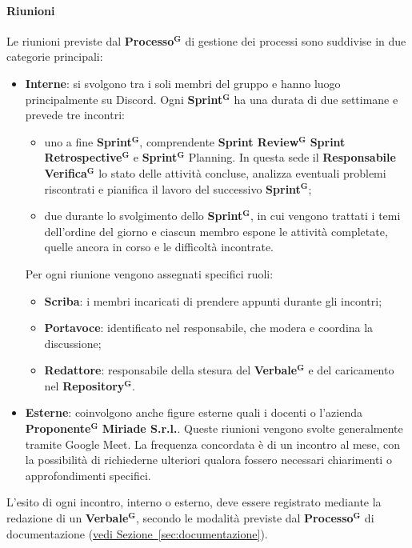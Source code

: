 \documentclass[a4paper,12pt]{article}
\newcommand{\term}[1]{\textbf{#1}$^\mathbf{G}$}
\begin{document}
\paragraph{Riunioni}
Le riunioni previste dal \term{Processo} di gestione dei processi sono suddivise in due categorie principali:
\begin{itemize}
    \item \textbf{Interne}: si svolgono tra i soli membri del gruppo e hanno luogo principalmente su Discord. Ogni \term{Sprint} ha una durata di due settimane e prevede tre incontri:
    \begin{itemize}
        \item uno a fine \term{Sprint}, comprendente \term{Sprint Review} \term{Sprint Retrospective} e \term{Sprint} Planning. In questa sede il \textbf{Responsabile} \term{Verifica} lo stato delle attività concluse, analizza eventuali problemi riscontrati e pianifica il lavoro del successivo \term{Sprint};
        \item due durante lo svolgimento dello \term{Sprint}, in cui vengono trattati i temi dell'ordine del giorno e ciascun membro espone le attività completate, quelle ancora in corso e le difficoltà incontrate.
    \end{itemize}
    Per ogni riunione vengono assegnati specifici ruoli:
    \begin{itemize}
        \item \textbf{Scriba}: i membri incaricati di prendere appunti durante gli incontri;
        \item \textbf{Portavoce}: identificato nel responsabile, che modera e coordina la discussione;
        \item \textbf{Redattore}: responsabile della stesura del \term{Verbale} e del caricamento nel \term{Repository}.
    \end{itemize}
    \item \textbf{Esterne}: coinvolgono anche figure esterne quali i docenti o l'azienda \term{Proponente} \textbf{Miriade S.r.l.}. Queste riunioni vengono svolte generalmente tramite Google Meet. La frequenza concordata è di un incontro al mese, con la possibilità di richiederne ulteriori qualora fossero necessari chiarimenti o approfondimenti specifici.
\end{itemize}
L'esito di ogni incontro, interno o esterno, deve essere registrato mediante la redazione di un \term{Verbale}, secondo le modalità previste dal \term{Processo} di documentazione (\hyperref[sec:documentazione]{vedi Sezione~\ref*{sec:documentazione}}). 
\end{document}
